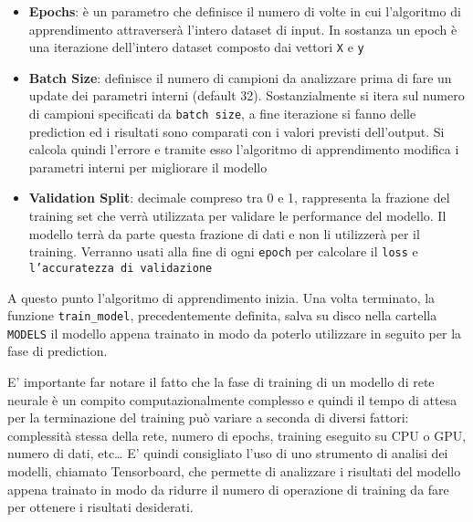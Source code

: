 \begin{itemize}
  \item \textbf{Epochs}: è un parametro che definisce il numero di volte in cui l’algoritmo di apprendimento attraverserà l’intero dataset di input. In sostanza un epoch è una iterazione dell’intero dataset composto dai vettori \texttt{X} e \texttt{y}
  \item \textbf{Batch Size}: definisce il numero di campioni da analizzare prima di fare un update dei parametri interni (default 32). Sostanzialmente si itera sul numero di campioni specificati da \texttt{batch size}, a fine iterazione si fanno delle prediction ed i risultati sono comparati con i valori previsti dell’output. Si calcola quindi l’errore e tramite esso l’algoritmo di apprendimento modifica i parametri interni per migliorare il modello
  \item \textbf{Validation Split}: decimale compreso tra 0 e 1, rappresenta la frazione del training set che verrà utilizzata per validare le performance del modello. Il modello terrà da parte questa frazione di dati e non li utilizzerà per il training. Verranno usati alla fine di ogni \texttt{epoch} per calcolare il \texttt{loss} e \texttt{l’accuratezza di validazione}  
\end{itemize}

A questo punto l’algoritmo di apprendimento inizia. Una volta terminato, la funzione \texttt{train\_model}, precedentemente definita, salva su disco nella cartella \texttt{MODELS} il modello appena trainato in modo da poterlo utilizzare in seguito per la fase di prediction. 

E’ importante far notare il fatto che la fase di training di un modello di rete neurale è un compito computazionalmente complesso e quindi il tempo di attesa per la terminazione del training può variare a seconda di diversi fattori: complessità stessa della rete, numero di epochs, training eseguito su CPU o GPU, numero di dati, etc… E’ quindi consigliato l’uso di uno strumento di analisi dei modelli, chiamato Tensorboard, che permette di analizzare i risultati del modello appena trainato in modo da ridurre il numero di operazione di training da fare per ottenere i risultati desiderati.

